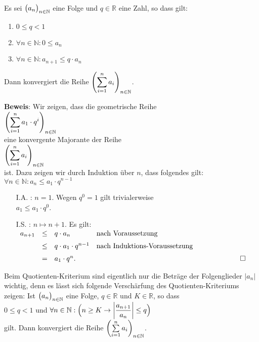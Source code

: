 \begin{Satz}
Es sei $\bigl(a_n\bigr)_{n\in\mathbb{N}}$ eine Folge und $q\in\mathbb{R}$ eine Zahl, so dass gilt:
\begin{enumerate}
\item $0 \leq q < 1$
\item $\forall n \in \mathbb{N}: 0 \leq a_n$
\item $\forall n \in \mathbb{N}: a_{n+1} \leq q \cdot  a_n$
\end{enumerate}
Dann konvergiert die Reihe $\displaystyle\left(\sum\limits_{i=1}^n a_i\right)_{n\in\mathbb{N}}$.
\end{Satz}

\noindent 
\textbf{Beweis}:  Wir zeigen, dass die geometrische Reihe
\\[0.2cm]
\hspace*{1.3cm}
 $\displaystyle\left(\sum\limits_{i=1}^n a_1\cdot q^i\right)_{n\in\mathbb{N}}$ 
\\[0.2cm]
eine konvergente Majorante der Reihe
\\[0.2cm]
\hspace*{1.3cm}
 $\displaystyle\left(\sum\limits_{i=1}^n a_i\right)_{n\in\mathbb{N}}$ 
\\[0.2cm]
ist.  Dazu zeigen wir durch Induktion \"uber $n$, dass folgendes gilt:
\\[0.2cm]
\hspace*{1.3cm}
$\forall n \in \mathbb{N}: a_{n} \leq a_1 \cdot q^{n-1}$
\begin{enumerate}
\item[I.A.]: $n = 1$.  Wegen $q^0 = 1$ gilt trivialerweise
      \\[0.2cm]
      \hspace*{1.3cm} $a_1  \leq a_1 \cdot  q^0$.
\item[I.S.]: $n \mapsto n+1$.  Es gilt: 
      \\[0.2cm]
      \hspace*{1.3cm}      
      $
      \begin{array}{lclll}
        a_{n+1} & \leq & q \cdot  a_n        & \mbox{nach Voraussetzung} \\[0.2cm]
                & \leq & q \cdot  a_1 \cdot  q^{n-1}  & \mbox{nach Induktions-Voraussetzung} \\[0.2cm]
                & =    & a_1 \cdot  q^{n}. & &\hspace*{2cm} \Box
              \end{array}
      $
\end{enumerate}

\remark
Beim Quotienten-Kriterium sind eigentlich nur die Betr\"age der
Folgenglieder $|a_n|$ wichtig, denn es l\"asst sich folgende Versch\"arfung des
Quotienten-Kriteriums zeigen:  
Ist $\bigl(a_n\bigr)_{n\in\mathbb{N}}$ eine Folge, $q\in\mathbb{R}$ und $K \in \mathbb{R}$, so dass 
\\[0.2cm]
\hspace*{1.3cm}
$0 \leq q < 1$ \quad und \quad $\displaystyle\forall n \in \mathbb{N}: \Bigl(n \geq K \rightarrow \left|\frac{a_{n+1}}{a_n}\right| \leq q\Bigr)$
\\[0.2cm]
gilt.  Dann konvergiert die Reihe $\left(\sum\limits_{i=1}^n a_i\right)_{n\in\mathbb{N}}$.


